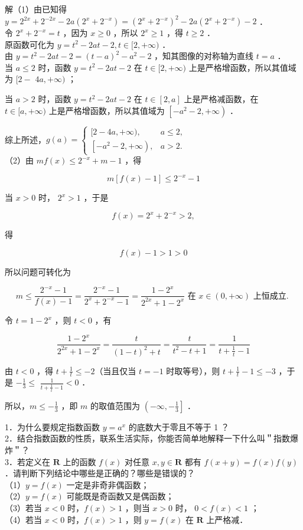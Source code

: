 \documentclass[10pt]{article}
\begin{document}
解（1）由已知得 \(y=2^{2 x}+2^{-2 x}-2 a\left(2^{x}+2^{-x}\right)=\left(2^{x}+2^{-x}\right)^{2}-2 a\left(2^{x}+2^{-x}\right)-2\) ．\\
令 \(2^{x}+2^{-x}=t\) ，因为 \(x \geqslant 0\) ，所以 \(2^{x} \geqslant 1\) ，得 \(t \geqslant 2\) ．\\
原函数可化为 \(y=t^{2}-2 a t-2, t \in[2,+\infty)\) ．\\
由 \(y=t^{2}-2 a t-2=(t-a)^{2}-a^{2}-2\) ，知其图像的对称轴为直线 \(t=a\) ．\\
当 \(a \leqslant 2\) 时，函数 \(y=t^{2}-2 a t-2\) 在 \(t \in[2,+\infty)\) 上是严格增函数，所以其值域为 \([2-\) \(4 a,+\infty)\) ；

当 \(a>2\) 时，函数 \(y=t^{2}-2 a t-2\) 在 \(t \in[2, a]\) 上是严格减函数，在 \(t \in[a,+\infty)\) 上是严格增函数，所以其值域为 \(\left[-a^{2}-2,+\infty\right)\) ．

综上所述，\(g(a)= \begin{cases}{[2-4 a,+\infty),} & a \leqslant 2, \\ {\left[-a^{2}-2,+\infty\right),} & a>2 .\end{cases}\)\\
（2）由 \(m f(x) \leqslant 2^{-x}+m-1\) ，得

\[
m[f(x)-1] \leqslant 2^{-x}-1
\]

当 \(x>0\) 时， \(2^{x}>1\) ，于是

\[
f(x)=2^{x}+2^{-x}>2,
\]

得

\[
f(x)-1>1>0
\]

所以问题可转化为

\[
m \leqslant \frac{2^{-x}-1}{f(x)-1}=\frac{2^{-x}-1}{2^{x}+2^{-x}-1}=\frac{1-2^{x}}{2^{2 x}+1-2^{x}} \text { 在 } x \in(0,+\infty) \text { 上恒成立. }
\]

令 \(t=1-2^{x}\) ，则 \(t<0\) ，有

\[
\frac{1-2^{x}}{2^{2 x}+1-2^{x}}=\frac{t}{(1-t)^{2}+t}=\frac{t}{t^{2}-t+1}=\frac{1}{t+\frac{1}{t}-1}
\]

由 \(t<0\) ，得 \(t+\frac{1}{t} \leqslant-2\)（当且仅当 \(t=-1\) 时取等号），则 \(t+\frac{1}{t}-1 \leqslant-3\) ，于是 \(-\frac{1}{3} \leqslant\) \(\frac{1}{t+\frac{1}{t}-1}<0\) ．

所以，\(m \leqslant-\frac{1}{3}\) ，即 \(m\) 的取值范围为 \(\left(-\infty,-\frac{1}{3}\right]\) ．

1．为什么要规定指数函数 \(y=a^{x}\) 的底数大于零且不等于 1 ？\\
2．结合指数函数的性质，联系生活实际，你能否简单地解释一下什么叫＂指数爆炸＂？\\
3．若定义在 \(\mathbf{R}\) 上的函数 \(f(x)\) 对任意 \(x, y \in \mathbf{R}\) 都有 \(f(x+y)=f(x) f(y)\) ．请判断下列结论中哪些是正确的？哪些是错误的？\\
（1）\(y=f(x)\) 一定是非奇非偶函数；\\
（2）\(y=f(x)\) 可能既是奇函数又是偶函数；\\
（3）若当 \(x<0\) 时，\(f(x)>1\) ，则当 \(x>0\) 时， \(0<f(x)<1\) ；\\
（4）若当 \(x<0\) 时，\(f(x)>1\) ，则 \(y=f(x)\) 在 \(\mathbf{R}\) 上严格减．
\end{document}

